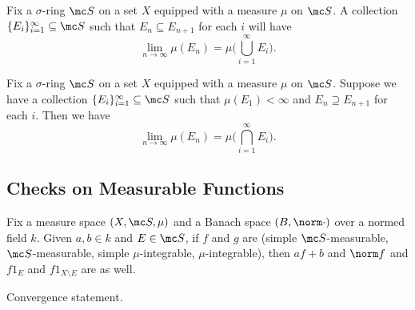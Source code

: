 \documentclass{article}
\begin{document}
\begin{proposition} \label{prop:measure-union-up}
	Fix a $\sigma$-ring $\mc S$ on a set $X$ equipped with a measure $\mu$ on $\mc S$. A collection $\{E_i\}_{i=1}^\infty\subseteq\mc S$ such that $E_n\subseteq E_{n+1}$ for each $i$ will have
	\[\lim_{n\to\infty}\mu(E_n)=\mu\Bigg(\bigcup_{i=1}^\infty E_i\Bigg).\]
\end{proposition}
\begin{cor} \label{cor:measure-inter-down}
	Fix a $\sigma$-ring $\mc S$ on a set $X$ equipped with a measure $\mu$ on $\mc S$. Suppose we have a collection $\{E_i\}_{i=1}^\infty\subseteq\mc S$ such that $\mu(E_1)<\infty$ and $E_n\supseteq E_{n+1}$ for each $i$. Then we have
	\[\lim_{n\to\infty}\mu(E_n)=\mu\Bigg(\bigcap_{i=1}^\infty E_i\Bigg).\]
\end{cor}

\subsection{Checks on Measurable Functions}
\begin{lemma}
	Fix a measure space $(X,\mc S,\mu)$ and a Banach space $(B,\norm\cdot)$ over a normed field $k$. Given $a,b\in k$ and $E\in\mc S$, if $f$ and $g$ are (simple $\mc S$-measurable, $\mc S$-measurable, simple $\mu$-integrable, $\mu$-integrable), then $af+b$ and $\norm f$ and $f1_E$ and $f1_{X\setminus E}$ are as well.
\end{lemma}
\begin{lemma}
	Convergence statement.
\end{lemma}
\end{document}
